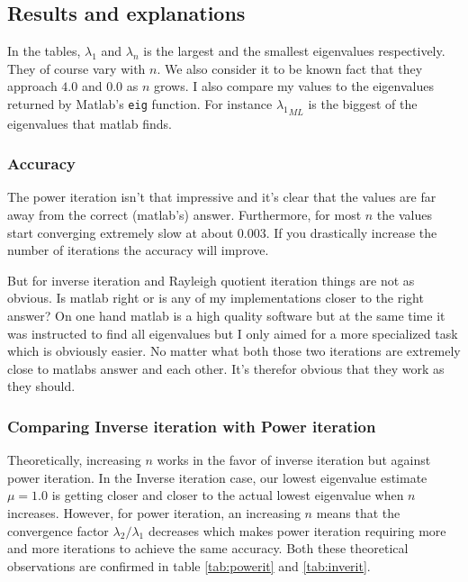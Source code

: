 \documentclass[a4paper,11pt]{article}
\begin{document}
\subsection{Results and explanations}


In the tables, $\lambda_1$ and $\lambda_n$ is the largest and the
smallest eigenvalues respectively. They of course vary with $n$. We also
consider it to be known fact that they approach $4.0$ and $0.0$
as $n$ grows. I also compare my values to the eigenvalues
returned by Matlab's \texttt{eig} function. For instance
${\lambda_1}_{ML}$ is the biggest of the eigenvalues that matlab finds.

\subsubsection{Accuracy}

The power iteration isn't that impressive and it's clear that the values
are far away from the correct (matlab's) answer. Furthermore, for most
$n$ the values start converging extremely slow at about $0.003$. If you
drastically increase the number of iterations the accuracy will improve.

But for inverse iteration and Rayleigh quotient iteration things are not
as obvious. Is matlab right or is any of my implementations closer to
the right answer? On one hand matlab is a high quality software but at
the same time it was instructed to find all eigenvalues but I only aimed
for a more specialized task which is obviously easier. No matter what
both those two iterations are extremely close to matlabs answer and each
other. It's therefor obvious that they work as they should.

\subsubsection{Comparing Inverse iteration with Power iteration}

Theoretically, increasing $n$ works in the favor of inverse
iteration but against power iteration. In the Inverse iteration
case, our lowest eigenvalue estimate $\mu=1.0$ is getting closer and
closer to the actual lowest eigenvalue when $n$ increases. However, for
power iteration, an increasing $n$ means that the convergence factor
$\lambda_2/\lambda_1$ decreases which makes power iteration requiring
more and more iterations to achieve the same accuracy. Both these
theoretical observations are confirmed in table \ref{tab:powerit}
and \ref{tab:inverit}.
\end{document}
